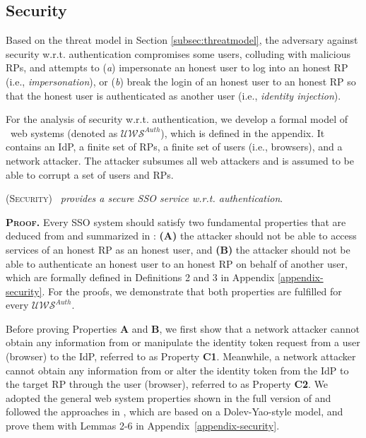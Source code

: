 \subsection{Security}
\label{analysis-security}

Based on the threat model in Section \ref{subsec:threatmodel}, the adversary against security w.r.t. authentication \cite{FettKS14,BrowserID,SPRESSO} compromises some users, colluding with malicious RPs, and attempts to (\emph{a}) impersonate an honest user to log into an honest RP (i.e., \emph{impersonation}), or (\emph{b}) break the login of an honest user to an honest RP so that the honest user is authenticated as another user (i.e., \emph{identity injection}). 



For the analysis of security w.r.t. authentication, we develop a formal model of \usso\ web systems (denoted as $\mathcal{U\!W\!S}^{Auth}$), which is defined in the appendix. It contains an IdP, a finite set of RPs, a finite set of users (i.e., browsers), and a network attacker. The attacker subsumes all web attackers and is assumed to be able to  corrupt a set of users and RPs.


\begin{thm}
\textsc{(Security)} \emph{\usso\ provides a secure SSO service w.r.t. authentication}.
\label{thm-security}
\end{thm}

\noindent\textbf{\textsc{Proof.}} Every SSO system should satisfy two fundamental properties that are deduced from \cite{FettKS14} and summarized in \cite{BrowserID,SPRESSO}: {\bf (A)} the attacker should not be able to access services of an honest RP as an honest user, and {\bf (B)} the attacker should not be able to authenticate an honest user to an honest RP on behalf of another user, which are formally defined in Definitions 2 and 3 in Appendix \ref{appendix-security}. For the proofs, we demonstrate that both properties are fulfilled for every $\mathcal{UWS}^{Auth}$. 

Before proving Properties {\bf A} and {\bf B}, we first show that a network attacker cannot obtain any information from or manipulate the identity token request from a user (browser) to the IdP, referred to as Property {\bf C1}. Meanwhile, a network attacker cannot obtain any information from or alter the identity token from the IdP to the target RP through the user (browser), referred to as Property {\bf C2}. We adopted the general web system properties shown in the full version of \cite{FettKS14} and followed the approaches in \cite{BrowserID,SPRESSO}, which are based on a Dolev-Yao-style model, and prove them with Lemmas 2-6 in Appendix~\ref{appendix-security}. 

